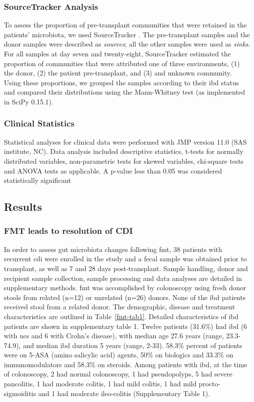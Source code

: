 \subsubsection{SourceTracker Analysis}
To assess the proportion of pre-transplant communities that were retained in the patients' microbiota, we used SourceTracker \cite{RN3995}. The pre-transplant samples and the donor samples were described as \textit{sources}; all the other samples were used as \textit{sinks}. For all samples at day seven and twenty-eight, SourceTracker estimated the proportion of communities that were attributed one of three environments, (1) the donor, (2) the patient pre-transplant, and (3) and unknown community. Using these proportions, we grouped the samples according to their \gls{ibd} status and compared their distributions using the Mann-Whitney test (as implemented in SciPy 0.15.1\cite{RN165}).

\subsubsection{Clinical Statistics}
Statistical analyses for clinical data were performed with JMP version 11.0 (SAS institute, NC).  Data analysis included descriptive statistics, t-tests for normally distributed variables, non-parametric tests for skewed variables, chi-square tests and ANOVA tests as applicable. A p-value less than 0.05 was considered statistically significant


\subsection{Results}

\subsubsection{FMT leads to resolution of CDI}
In order to assess gut microbiota changes following \gls{fmt}, 38 patients with recurrent \gls{cdi} were enrolled in the study and a fecal sample was obtained prior to transplant, as well as 7 and 28 days post-transplant. Sample handling, donor and recipient sample collection, sample processing and data analyses are detailed in supplementary methods. \gls{fmt} was accomplished by colonoscopy using fresh donor stools from related (n=12) or unrelated (n=26) donors. None of the \gls{ibd} patients received stool from a related donor. The demographic, disease and treatment characteristics are outlined in Table~\ref{fmt-tab1}. Detailed characteristics of \gls{ibd} patients are shown in supplementary table 1. Twelve patients (31.6\%) had \gls{ibd} (6 with \glspl{uc} and 6 with Crohn's disease), with median age 27.6 years (range, 23.3-74.9), and median \gls{ibd} duration 5 years (range, 2-33). 58.3\% percent of patients were on 5-ASA (amino salicylic acid) agents, 50\% on biologics and 33.3\% on immunomodulators and 58.3\% on steroids.  Among patients with \gls{ibd}, at the time of colonoscopy, 2 had normal colonoscopy, 1 had pseudopolyps, 5 had severe pancolitis, 1 had moderate colitis, 1 had mild colitis, 1 had mild procto-sigmoiditis and 1 had moderate ileo-colitis (Supplementary Table 1).

